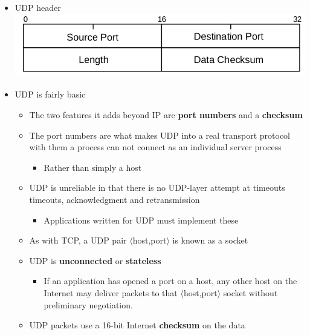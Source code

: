\documentclass[11pt]{article}
\makeatletter
\def\maxwidth{\ifdim\Gin@nat@width>\linewidth\linewidth
    \else\Gin@nat@width\fi}
\let\Oldincludegraphics\includegraphics
\renewcommand{\includegraphics}[1]{\Oldincludegraphics[width=.8\maxwidth]{#1}}
\providecommand{\tightlist}{%
      \setlength{\itemsep}{0pt}\setlength{\parskip}{0pt}}
\makeatother
\begin{document}
\begin{itemize}
\tightlist
\item
  UDP header \includegraphics{img/udp_header.png}
\item
  UDP is fairly basic

  \begin{itemize}
  \tightlist
  \item
    The two features it adds beyond IP are \textbf{port numbers} and a
    \textbf{checksum}
  \item
    The port numbers are what makes UDP into a real transport protocol
    with them a process can not connect as an individual server process

    \begin{itemize}
    \tightlist
    \item
      Rather than simply a host
    \end{itemize}
  \item
    UDP is unreliable in that there is no UDP-layer attempt at timeouts
    timeouts, acknowledgment and retransmission

    \begin{itemize}
    \tightlist
    \item
      Applications written for UDP must implement these
    \end{itemize}
  \item
    As with TCP, a UDP pair \(\langle\)host,port\(\rangle\) is known as
    a socket
  \item
    UDP is \textbf{unconnected} or \textbf{stateless}

    \begin{itemize}
    \tightlist
    \item
      If an application has opened a port on a host, any other host on
      the Internet may deliver packets to that
      \(\langle\)host,port\(\rangle\) socket without preliminary
      negotiation.
    \end{itemize}
  \item
    UDP packets use a 16-bit Internet \textbf{checksum} on the data


\end{itemize}
\end{itemize}
\end{document}
